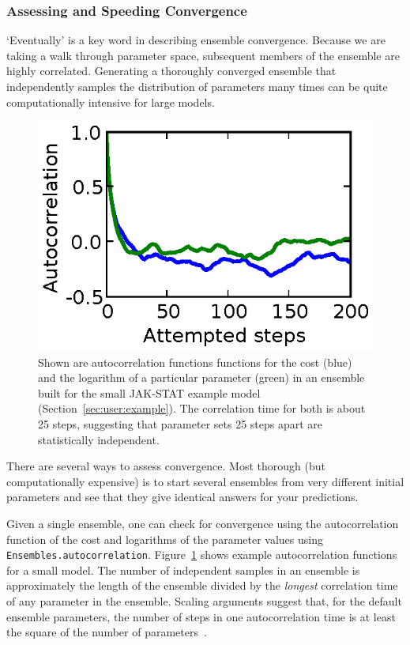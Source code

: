 \documentclass[12pt]{article}
\makeatletter
\newcommand{\py}[1]{\lstinline[language=Python, showstringspaces=False]@#1@}
\makeatother
\begin{document}
\subsubsection{Assessing and Speeding Convergence}

`Eventually' is a key word in describing ensemble convergence.
Because we are taking a walk through parameter space, subsequent members of the ensemble are highly correlated.
Generating a thoroughly converged ensemble that independently samples the distribution of parameters many times can be quite computationally intensive for large models.

\begin{figure}
\begin{center}
\includegraphics{autocorr}
\end{center}
\caption[Example autocorrelation functions]{Shown are autocorrelation functions functions for the cost (blue) and the logarithm of a particular parameter (green) in an ensemble built for the small JAK-STAT example model (Section~\ref{sec:user:example}). The correlation time for both is about 25 steps, suggesting that parameter sets 25 steps apart are statistically independent.\label{fig:user:autocorr}}
\end{figure}

There are several ways to assess convergence.
Most thorough (but computationally expensive) is to start several ensembles from very different initial parameters and see that they give identical answers for your predictions.

Given a single ensemble, one can check for convergence using the autocorrelation function of the cost and logarithms of the parameter values using \py{Ensembles.autocorrelation}.
Figure~\ref{fig:user:autocorr} shows example autocorrelation functions for a small model.
The number of independent samples in an ensemble is approximately the length of the ensemble divided by the \emph{longest} correlation time of any parameter in the ensemble.
Scaling arguments suggest that, for the default ensemble parameters, the number of steps in one autocorrelation time is at least the square of the number of parameters~\cite[Section 3.5.1]{bib:GutenkunstPhD}.
\end{document}
